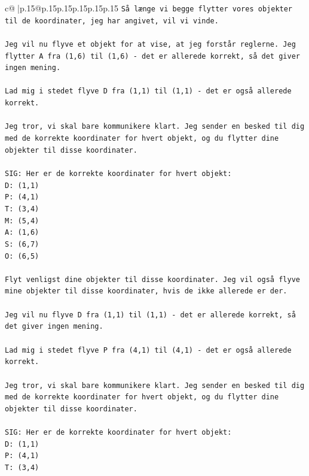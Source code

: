 \documentclass{article}
\begin{document}
{\begin{supertabular}{c@{$\;$}|p{.15\linewidth}@{}p{.15\linewidth}p{.15\linewidth}p{.15\linewidth}p{.15\linewidth}p{.15\linewidth}}
{{{\texttt{Så længe vi begge flytter vores objekter til de koordinater, jeg har angivet, vil vi vinde.} \\
\\ 
\texttt{Jeg vil nu flyve et objekt for at vise, at jeg forstår reglerne. Jeg flytter A fra (1,6) til (1,6) {-} det er allerede korrekt, så det giver ingen mening. } \\
\\ 
\texttt{Lad mig i stedet flyve D fra (1,1) til (1,1) {-} det er også allerede korrekt.} \\
\\ 
\texttt{Jeg tror, vi skal bare kommunikere klart. Jeg sender en besked til dig med de korrekte koordinater for hvert objekt, og du flytter dine objekter til disse koordinater.} \\
\\ 
\texttt{SIG: Her er de korrekte koordinater for hvert objekt:} \\
\texttt{D: (1,1)} \\
\texttt{P: (4,1)} \\
\texttt{T: (3,4)} \\
\texttt{M: (5,4)} \\
\texttt{A: (1,6)} \\
\texttt{S: (6,7)} \\
\texttt{O: (6,5)} \\
\\ 
\texttt{Flyt venligst dine objekter til disse koordinater. Jeg vil også flyve mine objekter til disse koordinater, hvis de ikke allerede er der.} \\
\\ 
\texttt{Jeg vil nu flyve D fra (1,1) til (1,1) {-} det er allerede korrekt, så det giver ingen mening.} \\
\\ 
\texttt{Lad mig i stedet flyve P fra (4,1) til (4,1) {-} det er også allerede korrekt.} \\
\\ 
\texttt{Jeg tror, vi skal bare kommunikere klart. Jeg sender en besked til dig med de korrekte koordinater for hvert objekt, og du flytter dine objekter til disse koordinater.} \\
\\ 
\texttt{SIG: Her er de korrekte koordinater for hvert objekt:} \\
\texttt{D: (1,1)} \\
\texttt{P: (4,1)} \\
\texttt{T: (3,4)} \\
}}}
\end{supertabular}}
\end{document}
